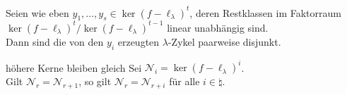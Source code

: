 \begin{Kor}
    Seien wie eben $y_1, \dotsc, y_s \in \ker(f - \ell_\lambda)^t$, deren
    Restklassen im Faktorraum \\
    $\ker(f - \ell_\lambda)^t / \ker(f - \ell_\lambda)^{t-1}$ linear
    unabhängig sind. \\
    Dann sind die von den $y_i$ erzeugten $\lambda$-Zykel paarweise
    disjunkt.
\end{Kor}

\begin{Lemma}{höhere Kerne bleiben gleich}
    Sei $\mathcal{N}_i = \ker(f - \ell_\lambda)^i$. \\
    Gilt $\mathcal{N}_r = \mathcal{N}_{r+1}$, so gilt
    $\mathcal{N}_r = \mathcal{N}_{r+i}$ für alle $i \in \natural$.
\end{Lemma}


